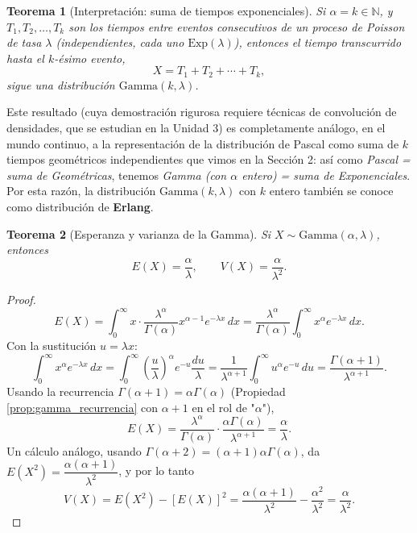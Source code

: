 \documentclass[11pt,a4paper]{article}
\theoremstyle{plain}
\newtheorem{teorema}{Teorema}[section]
\theoremstyle{definition}
\theoremstyle{remark}
\begin{document}
\begin{teorema}[Interpretación: suma de tiempos exponenciales]
Si $\alpha=k\in\mathbb{N}$, y $T_1,T_2,\dots,T_k$ son los tiempos entre eventos consecutivos de un proceso de Poisson de tasa $\lambda$ (independientes, cada uno $\text{Exp}(\lambda)$), entonces el tiempo transcurrido hasta el $k$-ésimo evento,
$$X=T_1+T_2+\cdots+T_k,$$
sigue una distribución $\text{Gamma}(k,\lambda)$.
\end{teorema}

Este resultado (cuya demostración rigurosa requiere técnicas de convolución de densidades, que se estudian en la Unidad 3) es completamente análogo, en el mundo continuo, a la representación de la distribución de Pascal como suma de $k$ tiempos geométricos independientes que vimos en la Sección 2: así como \emph{Pascal = suma de Geométricas}, tenemos \emph{Gamma (con $\alpha$ entero) = suma de Exponenciales}. Por esta razón, la distribución $\text{Gamma}(k,\lambda)$ con $k$ entero también se conoce como distribución de \textbf{Erlang}.

\begin{teorema}[Esperanza y varianza de la Gamma]
Si $X\sim\text{Gamma}(\alpha,\lambda)$, entonces
$$E(X)=\frac{\alpha}{\lambda},\qquad V(X)=\frac{\alpha}{\lambda^2}.$$
\end{teorema}
\begin{proof}
$$E(X)=\int_0^\infty x\cdot\frac{\lambda^\alpha}{\Gamma(\alpha)}x^{\alpha-1}e^{-\lambda x}\,dx=\frac{\lambda^\alpha}{\Gamma(\alpha)}\int_0^\infty x^{\alpha}e^{-\lambda x}\,dx.$$
Con la sustitución $u=\lambda x$:
$$\int_0^\infty x^{\alpha}e^{-\lambda x}\,dx=\int_0^\infty\left(\frac{u}{\lambda}\right)^{\alpha}e^{-u}\frac{du}{\lambda}=\frac{1}{\lambda^{\alpha+1}}\int_0^\infty u^{\alpha}e^{-u}\,du=\frac{\Gamma(\alpha+1)}{\lambda^{\alpha+1}}.$$
Usando la recurrencia $\Gamma(\alpha+1)=\alpha\Gamma(\alpha)$ (Propiedad \ref{prop:gamma_recurrencia} con $\alpha+1$ en el rol de "$\alpha$"),
$$E(X)=\frac{\lambda^\alpha}{\Gamma(\alpha)}\cdot\frac{\alpha\Gamma(\alpha)}{\lambda^{\alpha+1}}=\frac{\alpha}{\lambda}.$$
Un cálculo análogo, usando $\Gamma(\alpha+2)=(\alpha+1)\alpha\Gamma(\alpha)$, da $E(X^2)=\dfrac{\alpha(\alpha+1)}{\lambda^2}$, y por lo tanto
$$V(X)=E(X^2)-[E(X)]^2=\frac{\alpha(\alpha+1)}{\lambda^2}-\frac{\alpha^2}{\lambda^2}=\frac{\alpha}{\lambda^2}.$$
\end{proof}

\begin{center}
\end{center}
\end{document}
